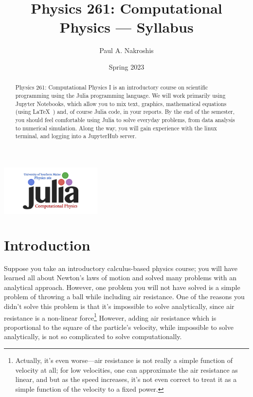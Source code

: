 \documentclass[justified]{tufte-handout}
\title{Physics 261: Computational Physics --- Syllabus}
\author[Paul A. Nakroshis]{Paul A. Nakroshis}
\date{Spring 2023}  %
\begin{document}
\maketitle%
  \begin{marginfigure} [7\baselineskip]\includegraphics[width=2in]{USM_Phy261_logo.png} \end{marginfigure}

\begin{abstract}
\noindent Physics 261: Computational Physics I is an introductory course on
scientific programming using the Julia programming language. We will work primarily 
using Jupyter Notebooks, which allow you to mix text, graphics, mathematical equations (using
 \LaTeX\ ) and, of course Julia code, in your reports.  By the 
end of the semester, you should feel comfortable using Julia to solve everyday 
problems, from data analysis to numerical simulation. Along the way, you will gain experience
with the linux terminal, and logging into a JupyterHub server. 
 \end{abstract}

\section{Introduction}\label{sec:page-layout}
Suppose you take an introductory calculus-based physics course; you will 
have learned all about Newton's laws of motion and solved many problems
with an analytical approach. However, one problem you will not have solved
is a simple problem of throwing a ball while including air resistance. One of the reasons 
you didn't solve this problem is that it's impossible to solve analytically, since air resistance is 
a non-linear force\footnote{Actually, it's even worse---air resistance is not really a simple function of velocity at all; for low velocities, one can approximate the air resistance as linear, and but as the speed increases, it's not even correct to treat it as a simple function of the velocity to a fixed power.} However, adding air resistance which is proportional to the square of the particle's velocity, while impossible to solve analytically, is not so complicated to solve computationally. 
\end{document}
